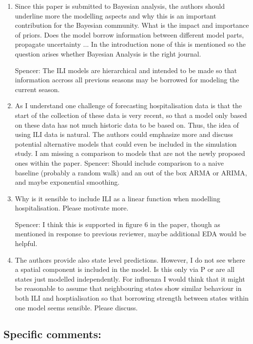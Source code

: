 \documentclass{article}
\newcommand{\spencer}[1]{{\color{green} Spencer: #1}}
\begin{document}
\begin{enumerate}[1.]

\item Since this paper is submitted to Bayesian analysis, the authors should 
underline more the modelling aspects and why this is an important contribution 
for the Bayesian community. What is the impact and importance of priors. Does 
the model borrow information between different model parts, propagate 
uncertainty ... In the introduction none of this is mentioned so the question 
arises whether Bayesian Analysis is the right journal.

\spencer{The ILI models are hierarchical and intended to be made so that information
accross all previous seasons may be borrowed for modeling the current season.}

\item As I understand one challenge of forecasting hospitalisation data is that the 
start of the collection of these data is very recent, so that a model only 
based on these data has not much historic data to be based on. Thus, the idea 
of using ILI data is natural. The authors could emphasize more and discuss 
potential alternative models that could even be included in the simulation 
study. I am missing a comparison to models that are not the newly proposed 
ones within the paper.
\spencer{Should include comparison to a naive baseline (probably a random walk) 
and an out of the box ARMA or ARIMA, and maybe exponential smoothing.}

\item Why is it sensible to include ILI as a linear function when modelling 
hospitalisation. Please motivate more. 

\spencer{I think this is supported in figure 6 in the paper, though as mentioned 
in response to previous reviewer, maybe additional EDA would be helpful.}

\item The authors provide also state level predictions. However, I do not see 
where a spatial component is included in the model. Is this only via P or are 
all states just modelled independently. For influenza I would think that it 
might be reasonable to assume that neighbouring states show similar behaviour 
in both ILI and hosptialisation so that borrowing strength between states 
within one model seems sensible. Please discuss.

\end{enumerate}


\subsection*{Specific comments:}
\end{document}
